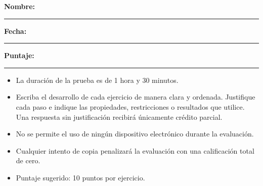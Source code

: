 \documentclass[10pt,a5paper]{article}
\begin{document}

\noindent
\textbf{Nombre:} \rule{7cm}{0.4pt}

\medskip
\noindent
\textbf{Fecha:} \rule{3cm}{0.4pt}
\hfill
\textbf{Puntaje:} \rule{1.5cm}{0.4pt}

\begin{nota}[indicaciones]
\begin{itemize}
  \item La duración de la prueba es de 1 hora y 30 minutos.
  \item Escriba el desarrollo de cada ejercicio de manera clara y ordenada.
  Justifique cada paso e indique las propiedades, restricciones o resultados que
  utilice. Una respuesta sin justificación recibirá únicamente crédito parcial.
  \item No se permite el uso de ningún dispositivo electrónico durante la
  evaluación.
  \item Cualquier intento de copia penalizará la evaluación con una calificación
  total de cero.
  \item Puntaje sugerido: 10 puntos por ejercicio.
\end{itemize}
\end{nota}
\end{document}
